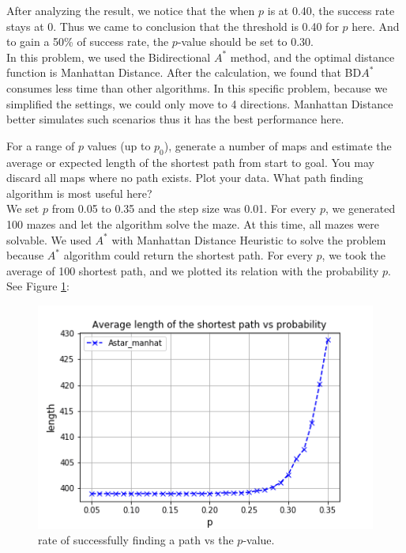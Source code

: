 \documentclass[letter]{article}
\begin{document}
\begin{questions}
	After analyzing the result, we notice that the when $ p $ is at 0.40, the success rate stays at 0. Thus we came to conclusion that the threshold is 0.40 for $ p $ here. And to gain a  50\%  of success rate, the $ p $-value should be set to 0.30. \\
	
	In this problem, we used the Bidirectional $ A^* $ method, and the optimal distance function is Manhattan Distance. After the calculation, we found that BD$ A^* $ consumes less time than other algorithms. In this specific problem, because we simplified the settings, we could only move to 4 directions. Manhattan Distance better simulates such scenarios thus it has the best performance here. \\
	
	
	\item {For a range of $ p $ values (up to $ p_0 $), generate a number of maps and estimate the average or expected length of the shortest path from start to goal. You may discard all maps where no path exists. Plot your data. What path finding algorithm is most useful here?} \\
	
	We set $ p $ from 0.05 to 0.35 and the step size was 0.01. For every $ p $, we generated 100 mazes and let the algorithm solve the maze. At this time, all mazes were solvable. We used $ A^* $ with Manhattan Distance Heuristic to solve the problem because $ A^* $ algorithm could return the shortest path. For every $ p $, we took the average of 100 shortest path, and we plotted its relation with the probability $ p $. See Figure \ref{fig:4}: \\
		
	\begin{figure}
		\centering
		\includegraphics[width=\textwidth]{../pics/question4.png}
		\caption{\label{fig:4}rate of successfully finding a path vs the $ p $-value.}
	\end{figure}


\end{questions}
\end{document}
